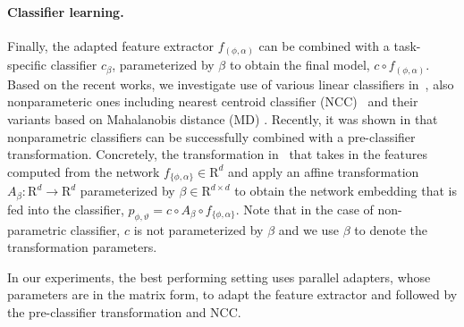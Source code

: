 \paragraph{Classifier learning.} 
Finally, the adapted feature extractor $f_{(\phi,\alpha)}$ can be combined with a task-specific classifier $c_{\beta}$, parameterized by $\beta$ to obtain the final model, \ie $c \circ f_{(\phi,\alpha)}$.
Based on the recent works, we investigate use of various linear classifiers in~\cite{dhillon2019baseline,lee2019meta,chen2020new,requeima2019fast}, also nonparameteric ones including nearest centroid classifier (NCC)~\cite{mensink2013distance,snell2017prototypical} and their variants based on Mahalanobis distance (MD) \cite{bateni2020improved}.
Recently, it was shown in \cite{li2021universal} that nonparametric classifiers can be successfully combined with a pre-classifier transformation.
Concretely, the transformation in~\cite{li2021universal} that takes in the features computed from the network $f_{\{\phi, \alpha\}} \in \mathrm{R}^d$ and apply an affine transformation $A_{\beta}:\mathrm{R}^d\rightarrow \mathrm{R}^d$ parameterized by $\beta\in\mathrm{R}^{d\times d}$ to obtain the network embedding that is fed into the classifier, \ie $p_{\phi,\vartheta} =  c \circ A_{\beta} \circ f_{\{\phi, \alpha\}}$.
Note that in the case of non-parametric classifier, $c$ is not parameterized by $\beta$ and we use $\beta$ to denote the transformation parameters.


In our experiments, the best performing setting uses parallel adapters, whose parameters are in the matrix form, to adapt the feature extractor and followed by the pre-classifier transformation and NCC.




